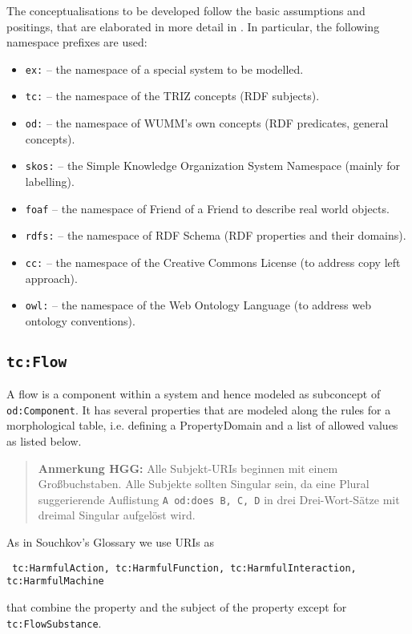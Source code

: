 \documentclass[a4paper,11pt]{article}
\newcommand{\HGG}[1]{\begin{quote}\textbf{Anmerkung HGG:} #1\end{quote}}
\begin{document}
    The conceptualisations to be developed follow the basic assumptions and
    positings, that are elaborated in more detail in \cite{Graebe2021}. In
    particular, the following namespace prefixes are used:
    \begin{itemize}[noitemsep]
    \item \texttt{ex:} -- the namespace of a special system to be modelled. 
    \item \texttt{tc:} -- the namespace of the TRIZ concepts (RDF subjects).
    \item \texttt{od:} -- the namespace of WUMM's own concepts (RDF predicates,
    general concepts).
    \item \texttt{skos:} -- the Simple Knowledge Organization System Namespace (mainly for labelling).
    \item \texttt{foaf} -- the namespace of Friend of a Friend to describe real world objects.
    \item \texttt{rdfs:} -- the namespace of RDF Schema (RDF properties and their domains).
    \item \texttt{cc:} -- the namespace of the Creative Commons License (to address copy left approach).
    \item \texttt{owl:} -- the namespace of the Web Ontology Language (to address web ontology conventions).
    \end{itemize}

    \subsection{\texttt{tc:Flow}}

    A flow is a component within a system and hence modeled as subconcept of
    \texttt{od:Component}.  It has several properties that are modeled along the
    rules for a morphological table, i.e. defining a PropertyDomain and a list of
    allowed values as listed below.

    \HGG{Alle Subjekt-URIs beginnen mit einem Großbuchstaben.  Alle Subjekte
    sollten Singular sein, da eine Plural suggerierende Auflistung \texttt{A
        od:does B, C, D} in drei Drei-Wort-Sätze mit dreimal Singular aufgelöst
    wird.}

    As in Souchkov's Glossary we use URIs as 
    \begin{center}\tt
    tc:HarmfulAction, tc:HarmfulFunction, tc:HarmfulInteraction,
    tc:HarmfulMachine
    \end{center}
    that combine the property and the subject of the property except for
    \texttt{tc:FlowSubstance}.
\end{document}

